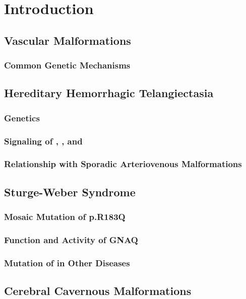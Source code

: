 \chapter{Introduction}

\section{Vascular Malformations}
\subsection{Common Genetic Mechanisms}

\section{Hereditary Hemorrhagic Telangiectasia}
\subsection{Genetics}
\subsection{Signaling of , , and }
\subsection{Relationship with Sporadic Arteriovenous Malformations}

\section{Sturge-Weber Syndrome}
\subsection{Mosaic Mutation of  p.R183Q}
\subsection{Function and Activity of GNAQ}
\subsection{Mutation of  in Other Diseases}

\section{Cerebral Cavernous Malformations}
